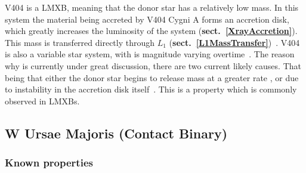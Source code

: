 \documentclass[12pt, a4paper]{article}
\begin{document}
        V404 is a LMXB, meaning that the donor star has a relatively low mass. In this system the material being accreted by V404 Cygni A forms an accretion disk, which greatly increases the luminosity of the system (\textbf{sect.~\ref{XrayAccretion}}). This mass is transferred directly through $L_1$ (\textbf{sect.~\ref{L1MassTransfer}})~\parencite{Bartolomeo_2023}. V404 is also a variable star system, with is magnitude varying overtime~\parencite{Bernardini_2016}. The reason why is currently under great discussion, there are two current likely causes. That being that either the donor star begins to release mass at a greater rate \parencite{TanakaLewin_1995}, or due to instability in the accretion disk itself~\parencite{Lasota_2001}. This is a property which is commonly observed in LMXBs. 


    \subsection{\centering W Ursae Majoris (Contact Binary)}
        \subsubsection{Known properties}
\end{document}
